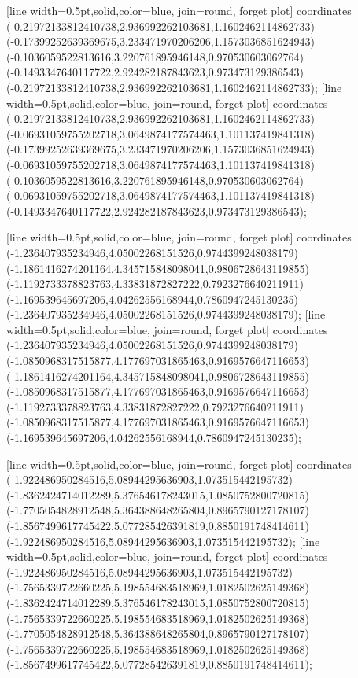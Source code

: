 [line width=0.5pt,solid,color=blue, join=round, forget plot] coordinates {(-0.21972133812410738,2.936992262103681,1.1602462114862733) (-0.17399252639369675,3.233471970206206,1.1573036851624943) (-0.1036059522813616,3.220761895946148,0.970530603062764) (-0.1493347640117722,2.924282187843623,0.973473129386543) (-0.21972133812410738,2.936992262103681,1.1602462114862733)};
[line width=0.5pt,solid,color=blue, join=round, forget plot] coordinates {(-0.21972133812410738,2.936992262103681,1.1602462114862733) (-0.06931059755202718,3.0649874177574463,1.101137419841318) (-0.17399252639369675,3.233471970206206,1.1573036851624943) (-0.06931059755202718,3.0649874177574463,1.101137419841318) (-0.1036059522813616,3.220761895946148,0.970530603062764) (-0.06931059755202718,3.0649874177574463,1.101137419841318) (-0.1493347640117722,2.924282187843623,0.973473129386543)};

[line width=0.5pt,solid,color=blue, join=round, forget plot] coordinates {(-1.236407935234946,4.05002268151526,0.9744399248038179) (-1.1861416274201164,4.345715848098041,0.9806728643119855) (-1.1192733378823763,4.33831872827222,0.7923276640211911) (-1.169539645697206,4.04262556168944,0.7860947245130235) (-1.236407935234946,4.05002268151526,0.9744399248038179)};
[line width=0.5pt,solid,color=blue, join=round, forget plot] coordinates {(-1.236407935234946,4.05002268151526,0.9744399248038179) (-1.0850968317515877,4.177697031865463,0.9169576647116653) (-1.1861416274201164,4.345715848098041,0.9806728643119855) (-1.0850968317515877,4.177697031865463,0.9169576647116653) (-1.1192733378823763,4.33831872827222,0.7923276640211911) (-1.0850968317515877,4.177697031865463,0.9169576647116653) (-1.169539645697206,4.04262556168944,0.7860947245130235)};

[line width=0.5pt,solid,color=blue, join=round, forget plot] coordinates {(-1.922486950284516,5.08944295636903,1.073515442195732) (-1.8362424714012289,5.376546178243015,1.0850752800720815) (-1.7705054828912548,5.364388648265804,0.8965790127178107) (-1.8567499617745422,5.077285426391819,0.8850191748414611) (-1.922486950284516,5.08944295636903,1.073515442195732)};
[line width=0.5pt,solid,color=blue, join=round, forget plot] coordinates {(-1.922486950284516,5.08944295636903,1.073515442195732) (-1.7565339722660225,5.198554683518969,1.0182502625149368) (-1.8362424714012289,5.376546178243015,1.0850752800720815) (-1.7565339722660225,5.198554683518969,1.0182502625149368) (-1.7705054828912548,5.364388648265804,0.8965790127178107) (-1.7565339722660225,5.198554683518969,1.0182502625149368) (-1.8567499617745422,5.077285426391819,0.8850191748414611)};

